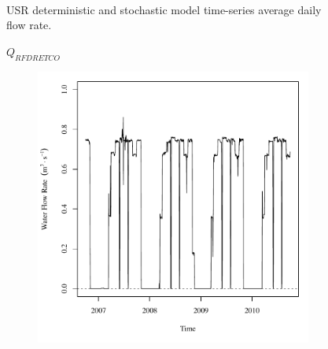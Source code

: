 \begin{linenumbers}
\begin{landscape}
\begin{figure}
\begin{subfigure}{0.7\textwidth}
		\end{subfigure}\\
		\caption{USR deterministic and stochastic model time-series average daily flow rate.}
	\end{figure}
\end{landscape}
\subfiguremid
\begin{landscape}
	\begin{figure}
		\centering
		$ Q_{RFDRETCO} $
		\begin{subfigure}{0.7\textwidth}
			\centering
			\includegraphics[width=\tableCustomSize]{"Figures/Results_USR/Deterministic/Q RFR"}
		\end{subfigure}%
		\begin{subfigure}{0.7\textwidth}
			\centering

\end{subfigure}
\end{figure}
\end{landscape}
\end{linenumbers}
